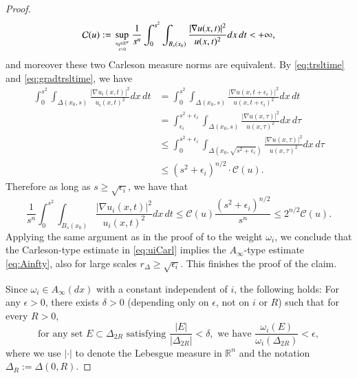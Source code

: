 \documentclass[11pt, a4paper,leqno]{amsart}
\theoremstyle{plain}
\theoremstyle{definition}
\theoremstyle{remark}
\numberwithin{equation}{section}
\begin{document}
\begin{proof}
\begin{equation}
	\mathcal{C}(u) := \sup_{x_0 \in \mathbb{R}^n \atop{s>0} } \frac{1}{s^n} \int_0^{s^2} \int_{B_{s}(x_0)} \frac{|\nabla u(x,t)|^2}{u(x,t)^2} dx \, dt < +\infty,
\end{equation}
and moreover these two Carleson measure norms are equivalent.
By \eqref{eq:trsltime} and \eqref{eq:gradtrsltime}, we have
\begin{align*}
	\int_0^{s^2} \int_{\Delta(x_0,s)} \frac{|\nabla u_i(x,t)|^2}{u_i(x,t)^2} dx\, dt & = \int_0^{s^2} \int_{\Delta(x_0,s)} \frac{|\nabla u(x,t + \epsilon_i)|^2}{u(x,t + \epsilon_i)^2} dx\, dt \\
	& = \int_{\epsilon_i}^{s^2 + \epsilon_i} \int_{\Delta(x_0,s)} \frac{|\nabla u(x,\tau)|^2}{u(x,\tau )^2} dx\, d\tau \\
	& \leq \int_{0}^{s^2 + \epsilon_i} \int_{\Delta(x_0,\sqrt{s^2+\epsilon_i})} \frac{|\nabla u(x,\tau)|^2}{u(x,\tau)^2} dx\, d\tau \\
	& \leq (s^2+\epsilon_i)^{n/2} \cdot \mathcal{C}(u).
\end{align*}
Therefore as long as $s\geq \sqrt{\epsilon_i}$, we have that
\begin{equation}\label{eq:uiCarl}
	\frac{1}{s^n} \int_0^{s^2} \int_{B_s(x_0)} \frac{|\nabla u_i(x,t)|^2}{u_i(x,t)^2} dx\, dt \leq \mathcal{C}(u) \frac{(s^2+\epsilon_i)^{n/2}}{s^n} \le 2^{n/2} \mathcal{C}(u). 
\end{equation} 
Applying the same argument as in the proof of \cite[Theorem 3.4]{FKP} to the weight $\omega_i$, we conclude that the Carleson-type estimate in \eqref{eq:uiCarl} implies the $A_\infty$-type estimate \eqref{eq:Ainfty}, also for large scales $r_\Delta \geq \sqrt{\epsilon_i}$. This finishes the proof of the claim.

 Since $\omega_i \in A_\infty(dx)$ with a constant independent of $i$, the following holds: For any $\epsilon>0$, there exists $\delta>0$ (depending only on $\epsilon$, not on $i$ or $R$) such that for every $R>0$,
\begin{equation}\label{eq:unifAinfty}
	\text{for any set } E\subset \Delta_{2R} \text{ satisfying } \frac{|E|}{|\Delta_{2R}|} < \delta, \text{ we have } \frac{\omega_i(E)}{\omega_i(\Delta_{2R})}< \epsilon, 
\end{equation}  
where we use $|\cdot|$ to denote the Lebesgue measure in $\mathbb{R}^n$ and the notation $\Delta_R := \Delta(0,R)$.


\end{proof}
\end{document}
